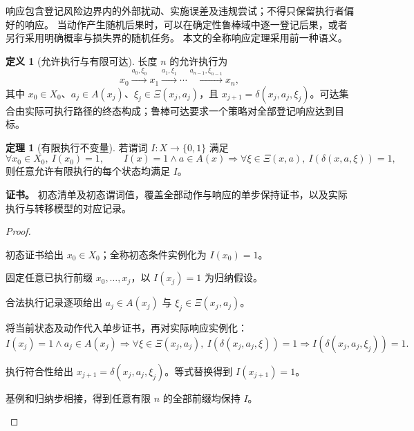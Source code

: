 \documentclass[UTF8,12pt,a4paper,openany,fontset=none,zihao=false]{ctexrep}
\theoremstyle{definition}
\newtheorem{definition}{定义}[chapter]
\newtheorem{theorem}{定理}[chapter]
\newenvironment{certificate}{\par\noindent\textbf{证书。}\ignorespaces}{\par}
\newcommand{\1}{\mathbf 1}
\begin{document}
响应包含登记风险边界内的外部扰动、实施误差及违规尝试；不得只保留执行者偏好的响应。
当动作产生随机后果时，可以在确定性鲁棒域中逐一登记后果，或者另行采用明确概率与损失界的随机任务。
本文的全称响应定理采用前一种语义。

\begin{definition}[允许执行与有限可达]
长度 \(n\) 的允许执行为
\[
x_0\xrightarrow{a_0,\xi_0}x_1\xrightarrow{a_1,\xi_1}\cdots
\xrightarrow{a_{n-1},\xi_{n-1}}x_n,
\]
其中 \(x_0\in X_0\)、\(a_j\in A(x_j)\)、\(\xi_j\in\Xi(x_j,a_j)\)，且
\(x_{j+1}=\delta(x_j,a_j,\xi_j)\)。可达集合由实际可执行路径的终态构成；鲁棒可达要求一个策略对全部登记响应达到目标。
\end{definition}

\begin{theorem}[有限执行不变量]
\label{base:induction}
若谓词 \(I:X\to\{0,1\}\) 满足
\[
\forall x_0\in X_0,\ I(x_0)=1,
\qquad
I(x)=1\land a\in A(x)\Longrightarrow
\forall\xi\in\Xi(x,a),\ I(\delta(x,a,\xi))=1,
\]
则任意允许有限执行的每个状态均满足 \(I\)。
\end{theorem}
\begin{certificate}
初态清单及初态谓词值，覆盖全部动作与响应的单步保持证书，以及实际执行与转移模型的对应记录。
\end{certificate}
\begin{proof}
\begin{semanticsteps}
\item 初态证书给出 \(x_0\in X_0\)；全称初态条件实例化为 \(I(x_0)=1\)。
\item 固定任意已执行前缀 \(x_0,\ldots,x_j\)，以 \(I(x_j)=1\) 为归纳假设。
\item 合法执行记录逐项给出 \(a_j\in A(x_j)\) 与 \(\xi_j\in\Xi(x_j,a_j)\)。
\item 将当前状态及动作代入单步证书，再对实际响应实例化：
\[
I(x_j)=1\land a_j\in A(x_j)
\Longrightarrow\forall\xi\in\Xi(x_j,a_j),\ I(\delta(x_j,a_j,\xi))=1
\Longrightarrow I(\delta(x_j,a_j,\xi_j))=1.
\]
\item 执行符合性给出 \(x_{j+1}=\delta(x_j,a_j,\xi_j)\)。等式替换得到 \(I(x_{j+1})=1\)。
\item 基例和归纳步相接，得到任意有限 \(n\) 的全部前缀均保持 \(I\)。
\end{semanticsteps}
\end{proof}
\end{document}
